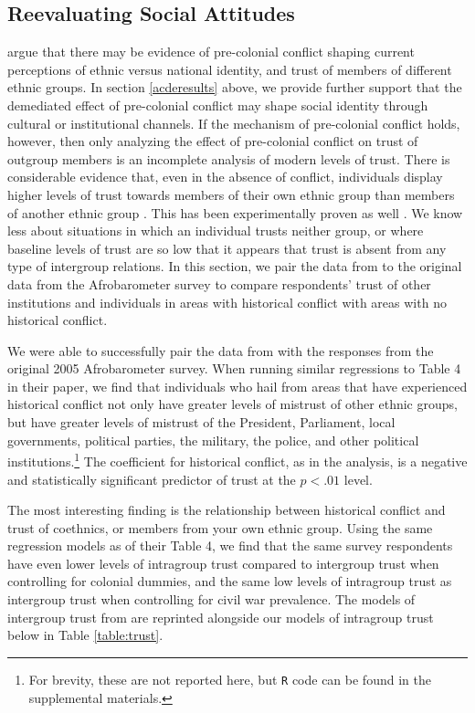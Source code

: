 \subsection{Reevaluating Social Attitudes}

\citet{BesleyRQ2014} argue that there may be evidence of pre-colonial conflict shaping current perceptions of ethnic versus national identity, and trust of members of different ethnic groups. In section \ref{acderesults} above, we provide further support that the demediated effect of pre-colonial conflict may shape social identity through cultural or institutional channels. If the mechanism of pre-colonial conflict holds, however, then only analyzing the effect of pre-colonial conflict on trust of outgroup members is an incomplete analysis of modern levels of trust. There is considerable evidence that, even in the absence of conflict, individuals display higher levels of trust towards members of their own ethnic group than members of another ethnic group \citep{FearonLaitin96, NunnWantchekon2011}. This has been experimentally proven as well \citep{Habyarimana}. We know less about situations in which an individual trusts neither group, or where baseline levels of trust are so low that it appears that trust is absent from any type of intergroup relations. In this section, we pair the data from \cite{BesleyRQ2014} to the original data from the Afrobarometer survey to compare respondents' trust of other institutions and individuals in areas with historical conflict with areas with no historical conflict. 

We were able to successfully pair the data from \cite{BesleyRQ2014} with the responses from the original 2005 Afrobarometer survey. When running similar regressions to Table 4 in their paper, we find that individuals who hail from areas that have experienced historical conflict not only have greater levels of mistrust of other ethnic groups, but have greater levels of mistrust of the President, Parliament, local governments, political parties, the military, the police, and other political institutions.\footnote{For brevity, these are not reported here, but \texttt{R} code can be found in the supplemental materials.} The coefficient for historical conflict, as in the \cite{BesleyRQ2014} analysis, is a negative and statistically significant predictor of trust at the $p < .01$ level. 

The most interesting finding is the relationship between historical conflict and trust of coethnics, or members from your own ethnic group. Using the same regression models as \cite{BesleyRQ2014} of their Table 4, we find that the same survey respondents have even lower levels of intragroup trust compared to intergroup trust when controlling for colonial dummies, and the same low levels of intragroup trust as intergroup trust when controlling for civil war prevalence. The models of intergroup trust from \cite{BesleyRQ2014} are reprinted alongside our models of intragroup trust below in Table \ref{table:trust}. 

